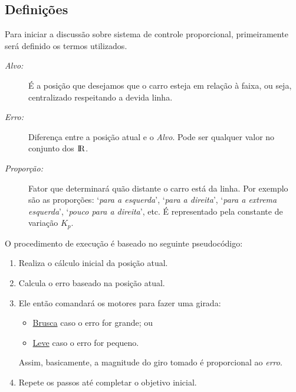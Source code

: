 \documentclass[portugues, brazil, a4paper,12pt]{article}
\begin{document}
	\subsection{Definições}
		Para iniciar a discussão sobre sistema de controle proporcional, primeiramente será definido os termos utilizados.

		\begin{description}
			\item[\textit{Alvo:}] É a posição que desejamos que o carro esteja em relação à faixa, ou seja, centralizado respeitando a devida linha.

			\item[\textit{Erro:}] Diferença entre a posição atual e o \textit{Alvo}. Pode ser qualquer valor no conjunto dos ${\rm I\!R}$.

			\item[\textit{Proporção:}] Fator que determinará quão distante o carro está da linha. Por exemplo são as proporções: `\textit{para a esquerda}',  `\textit{para a direita}', `\textit{para a extrema esquerda}', `\textit{pouco para a direita}', etc. É representado pela constante de variação $ K_p $.

		\end{description}


		O procedimento de execução é baseado no seguinte pseudocódigo:
		\begin{enumerate} \it
			\item Realiza o cálculo inicial da posição atual.

			\item Calcula o erro baseado na posição atual.

			\item Ele então comandará os motores para fazer uma girada:
			\begin{itemize}
				\item \underline{Brusca} caso o erro for grande; ou
				\item \underline{Leve} caso o erro for pequeno.
			\end{itemize}
			Assim, basicamente, a magnitude do giro tomado é proporcional ao \textit{erro}.

			\item Repete os passos até completar o objetivo inicial.
		\end{enumerate}
\end{document}
